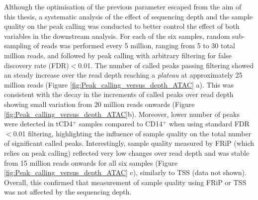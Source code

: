 Although the optimisation of the previous parameter escaped from the aim of this thesis, a systematic analysis of the effect of sequencing depth and the sample quality on the peak calling was conducted to better control the effect of both variables in the downstream analysis. For each of the six samples, random sub-sampling of reads was performed every 5 million, ranging from 5 to 30 total million reads, and followed by peak calling with arbitrary filtering for false discovery rate (FDR)$<$0.01. The number of called peaks passing filtering showed an steady increase over the read depth reaching a \textit{plateau} at approximately 25 million reads (Figure \ref{fig:Peak_calling_versus_depth_ATAC} a). This was consistent with the decay in the increments of called peaks over read depth showing small variation from 20 million reads onwards (Figure \ref{fig:Peak_calling_versus_depth_ATAC}b). Moreover, lower number of peaks were detected in tCD4$^+$ samples compared to CD14$^+$ when using standard  FDR$<$0.01 filtering, highlighting the influence of sample quality on the total number of significant called peaks. Interestingly, sample quality measured by FRiP (which relies on peak calling) reflected very low changes over read depth and was stable from 15 million reads onwards for all six samples (Figure \ref{fig:Peak_calling_versus_depth_ATAC} c), similarly to TSS (data not shown). Overall, this confirmed that measurement of sample quality using FRiP or TSS was not affected by the sequencing depth.


